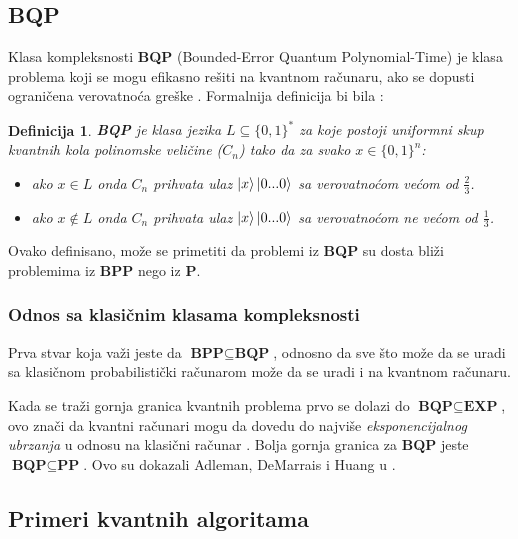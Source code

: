 \documentclass[12pt, letterpaper, oneside]{article}
\newtheorem{definition}{Definicija}
\begin{document}
\subsection{BQP}
Klasa kompleksnosti \textbf{BQP} (Bounded-Error Quantum Polynomial-Time) je klasa problema koji se mogu efikasno rešiti na kvantnom računaru, ako se dopusti ograničena verovatnoća greške \cite{nielsen_chuang_10th}.
Formalnija definicija bi bila \cite{aaronson2013quantum}:
\begin{definition}
    \textbf{BQP} je klasa jezika $L \subseteq \{0,1\}^{*}$ za koje postoji uniformni skup kvantnih kola polinomske veličine ($C_n$)
    tako da za svako $x \in \{0,1\}^{n}$:
    \begin{itemize}
        \item ako $x \in L$ onda $C_n$ prihvata ulaz $\Ket{x}\Ket{0...0}$ sa verovatnoćom većom od $\frac{2}{3}$.
        \item ako $x \notin L$ onda $C_n$ prihvata ulaz $\Ket{x}\Ket{0...0}$ sa verovatnoćom ne većom od $\frac{1}{3}$.
    \end{itemize} 
\end{definition}
Ovako definisano, može se primetiti da problemi iz \textbf{BQP} su dosta bliži problemima iz \textbf{BPP} nego iz \textbf{P}.
\subsubsection*{Odnos sa klasičnim klasama kompleksnosti}
Prva stvar koja važi jeste da $\textbf{BPP} \subseteq \textbf{BQP}$, odnosno da sve što može da se uradi sa klasičnom probabilistički računarom može da 
se uradi i na kvantnom računaru.

Kada se traži gornja granica kvantnih problema prvo se dolazi do $\textbf{BQP} \subseteq \textbf{EXP}$, ovo znači da kvantni računari mogu da dovedu
do najviše \textit{eksponencijalnog ubrzanja} u odnosu na klasični računar \cite{aaronson2013quantum}.
Bolja gornja granica za $\textbf{BQP}$ jeste $\textbf{BQP} \subseteq \textbf{PP}$. Ovo su dokazali Adleman, DeMarrais i Huang u \cite{adleman1997quantum}.
\subsection{Primeri kvantnih algoritama}
\end{document}
